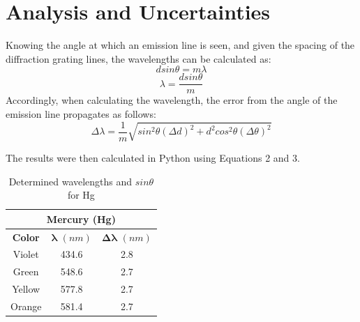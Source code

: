 \documentclass[a4paper, twocolumn]{article}
\begin{document}
\section{Analysis and Uncertainties}
Knowing the angle at which an emission line is seen, and given the spacing of the diffraction grating lines, the
wavelengths can be calculated as:
\begin{equation*}
 dsin\theta = m\lambda
\end{equation*}
\begin{equation}
 \lambda = \frac{dsin\theta}{m}
\end{equation}
Accordingly, when calculating the wavelength, the error from the angle of the emission line propagates as follows:
\begin{equation}
 \Delta\lambda = \frac{1}{m} \sqrt{ sin^2\theta (\Delta d)^2 + d^2 cos^2\theta (\Delta\theta)^2 }
\end{equation}

The results were then calculated in Python using Equations 2 and 3.

\begin{table}[h!]
\centering
\begin{tabular}{ |c||c|c| }
 \hline
 \multicolumn{3}{|c|}{\textbf{Mercury (Hg)}} \\
 \hline
 \textbf{Color} & $\boldsymbol{\lambda}$ $(nm)$ & $\boldsymbol{\Delta\lambda}$ $(nm)$ \\
 \hline
 Violet & 434.6 & 2.8 \\
 \hline
 Green & 548.6 & 2.7 \\ 
 \hline
 Yellow & 577.8 & 2.7 \\
 \hline
 Orange & 581.4 & 2.7 \\
 \hline
\end{tabular}
\caption{Determined wavelengths and $sin\theta$ for Hg}
\label{table:lambdaHg}
\end{table}
\end{document}
